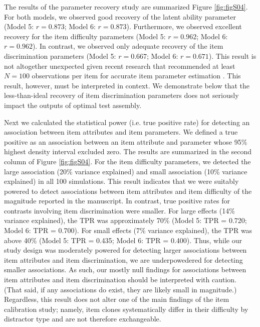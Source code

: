 \documentclass[a4paper,man,natbib]{apa6}
\begin{document}
The results of the parameter recovery study are summarized Figure \ref{fig:figS04}. For both models, we observed good recovery of the latent ability parameter (Model 5: $r = 0.873$; Model 6: $r = 0.873$). Furthermore, we observed excellent recovery for the item difficulty parameters (Model 5: $r = 0.962$; Model 6: $r = 0.962$). In contrast, we observed only adequate recovery of the item discrimination parameters (Model 5: $r = 0.667$; Model 6: $r = 0.671$). This result is not altogether unexpected given recent research that recommended at least $N=100$ observations per item for accurate item parameter estimation \citep{konig2020optimized}. This result, however, must be interpreted in context. We demonstrate below that the less-than-ideal recovery of item discrimination parameters does not seriously impact the outputs of optimal test assembly. 

Next we calculated the statistical power (i.e. true positive rate) for detecting an association between item attributes and item parameters. We defined a true positive as an association between an item attribute and parameter whose 95\% highest density interval excluded zero. The results are summarized in the second column of Figure \ref{fig:figS04}. For the item difficulty parameters, we detected the large association (20\% variance explained) and small association (10\% variance explained) in all 100 simulations. This result indicates that we were suitably powered to detect associations between item attributes and item difficulty of the magnitude reported in the manuscript. In contrast, true positive rates for contrasts involving item discrimination were smaller. For large effects (14\% variance explained), the TPR was approximately 70\% (Model 5: TPR = 0.720; Model 6: TPR = 0.700). For small effects (7\% variance explained), the TPR was above 40\% (Model 5: TPR = 0.435; Model 6: TPR = 0.400). Thus, while our study design was moderately powered for detecting larger associations between item attributes and item discrimination, we are underpowedered for detecting smaller associations. As such, our mostly null findings for associations between item attributes and item discrimination should be interpreted with caution. (That said, if any associations do exist, they are likely small in magnitude.) Regardless, this result does not alter one of the main findings of the item calibration study; namely, item clones systematically differ in their difficulty by distractor type and are not therefore exchangeable. 
\end{document}
